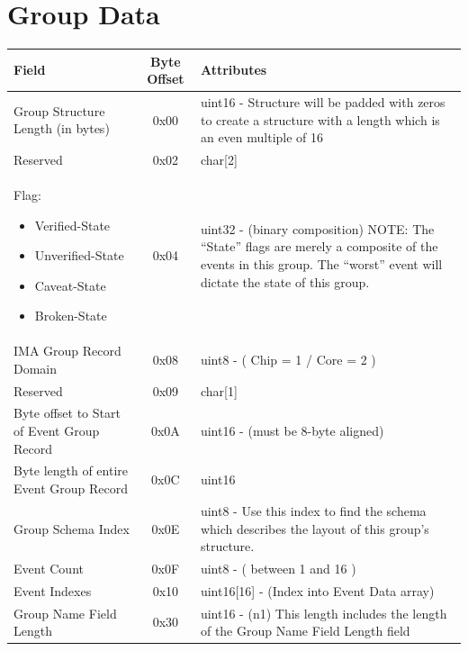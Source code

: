 \documentclass[14]{article}
\begin{document}
\pagebreak

\section{Group Data}
\begin{tabular}[l]{|p{5cm}|c|p{7cm}|}
  \hline
  \textbf{Field} & \textbf{Byte Offset} & \textbf{Attributes} \\
  \hline
  Group Structure Length (in bytes) & 0x00 & uint16 - Structure will be padded
                                             with zeros to create a structure
                                             with a length which is an even
                                             multiple of 16 \\
  \hline
  Reserved & 0x02 & char[2] \\
  \hline
  \parbox[t]{5cm} {
  Flag:
  \begin{itemize}
    \renewcommand\labelitemi{--}
    \setlength\itemsep{-0.4em}
  \item Verified-State
  \item Unverified-State
  \item Caveat-State
  \item Broken-State
  \end{itemize}
  } & 0x04 & uint32 - (binary composition) NOTE: The ``State'' flags are merely
               a composite of the events in this group. The ``worst'' event will
               dictate the state of this group. \\
  \hline
  IMA Group Record Domain & 0x08 & uint8 - ( Chip = 1 / Core = 2 ) \\
  \hline
  Reserved & 0x09 & char[1] \\
  \hline
  Byte offset to Start of Event Group Record & 0x0A & uint16 - (must be 8-byte
                                                      aligned) \\
  \hline
  Byte length of entire Event Group Record & 0x0C & uint16 \\
  \hline
  Group Schema Index & 0x0E & uint8 - Use this index to find the schema which
                              describes the layout of this group's structure. \\
  \hline
  Event Count & 0x0F & uint8 - ( between 1 and 16 ) \\
  \hline
  Event Indexes & 0x10 & uint16[16] - (Index into Event Data array) \\
  \hline
  Group Name Field Length & 0x30 & uint16 - (n1) This length includes the length
                                   of the Group Name Field Length field \\

\end{tabular}
\end{document}
